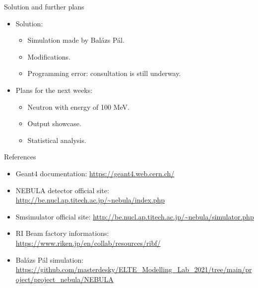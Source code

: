 \documentclass[11pt]{beamer}
\begin{document}
\begin{frame}{Solution and further plans}
    \begin{itemize}
    \item<tri@1-> Solution:
    \vspace{0.2 cm}
    \begin{itemize}
        \item<square@1-> Simulation made by Balázs Pál.
        \vspace{0.2 cm}
        \item<square@1-> Modifications.
        \vspace{0.2 cm}
        \item<square@1-> Programming error: consultation is still underway.
    \end{itemize}
    \vspace{0.2 cm}
    \item<tri@1-> Plans for the next weeks:
    \vspace{0.2 cm}
    \begin{itemize}
        \item<square@1-> Neutron with energy of 100 MeV.
        \vspace{0.2 cm}
        \item<square@1-> Output showcase.
        \vspace{0.2 cm}
        \item<square@1-> Statistical analysis.
    \end{itemize}
    \end{itemize}
\end{frame}

\begin{frame}{References}
    \begin{itemize}
        \item<tri@1-> Geant4 documentation: \url{https://geant4.web.cern.ch/}
        \vspace{0.2 cm}
        \item<tri@1-> NEBULA detector official site: \url{http://be.nucl.ap.titech.ac.jp/~nebula/index.php}
        \vspace{0.2 cm}
        \item<tri@1-> Smsimulator official site: \url{http://be.nucl.ap.titech.ac.jp/~nebula/simulator.php}
        \vspace{0.2 cm}
        \item<tri@1-> RI Beam factory informations: \url{https://www.riken.jp/en/collab/resources/ribf/}
        \vspace{0.2 cm}
        \item<tri@1-> Balázs Pál simulation: \url{https://github.com/masterdesky/ELTE_Modelling_Lab_2021/tree/main/project/project_nebula/NEBULA}
    \end{itemize}
\end{frame}
\end{document}
